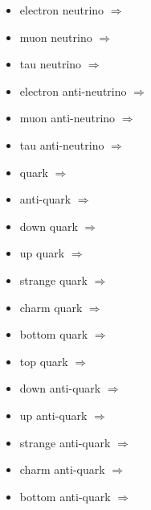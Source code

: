 \begin{multicols}{2}
{\begin{itemize}
\item electron neutrino\newline {} $\Rightarrow$ \Pgne
\item muon neutrino\newline {} $\Rightarrow$ \Pgngm
\item tau neutrino\newline {} $\Rightarrow$ \Pgngt
\item electron anti-neutrino\newline {} $\Rightarrow$ \Pagne
\item muon anti-neutrino\newline {} $\Rightarrow$ \Pagngm
\item tau anti-neutrino\newline {} $\Rightarrow$ \Pagngt
\item quark\newline {} $\Rightarrow$ \Pq
\item anti-quark\newline {} $\Rightarrow$ \Paq
\item down quark\newline {} $\Rightarrow$ \Pqd
\item up quark\newline {} $\Rightarrow$ \Pqu
\item strange quark\newline {} $\Rightarrow$ \Pqs
\item charm quark\newline {} $\Rightarrow$ \Pqc
\item bottom quark\newline {} $\Rightarrow$ \Pqb
\item top quark\newline {} $\Rightarrow$ \Pqt
\item down anti-quark\newline {} $\Rightarrow$ \Paqd
\item up anti-quark\newline {} $\Rightarrow$ \Paqu
\item strange anti-quark\newline {} $\Rightarrow$ \Paqs
\item charm anti-quark\newline {} $\Rightarrow$ \Paqc
\item bottom anti-quark\newline {} $\Rightarrow$ \Paqb

\end{itemize}}
\end{multicols}

